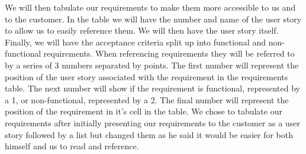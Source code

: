 We will then tabulate our requirements to make them more accessible to us and to the customer.
In the table we will have the number and name of the user story to allow us to easily reference them.
We will then have the user story itself.
Finally, we will have the acceptance criteria split up into functional and non-functional requirements.
When referencing requirements they will be referred to by a series of 3 numbers separated by points.
The first number will represent the position of the user story associated with the requirement in the requirements table.
The next number will show if the requirement is functional, represented by a 1, or non-functional, represented by a  2.
The final number will represent the position of the requirement in it’s cell in the table.
We chose to tabulate our requirements after initially presenting our requirements to the customer as a user story followed by a list but changed them as he said it would be easier for both himself and us to read and reference.



\restoregeometry


